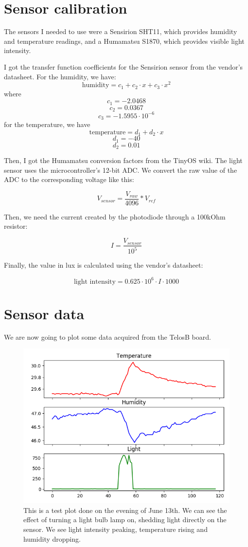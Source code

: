 \documentclass[11pt]{article}
\begin{document}
\section{Sensor calibration}
The sensors I needed to use were a Sensirion SHT11, which provides humidity and temperature readings, and a Humamatsu S1870, which provides visible light intensity. 

I got the transfer function coefficients for the Sensirion sensor from the vendor's datasheet. For the humidity, we have:
$$\text{humidity}=c_1+c_2\cdot x +c_3\cdot x^2$$
where
$$c_1= -2.0468$$
$$c_2=  0.0367$$
$$c_3= -1.5955\cdot10^{-6}$$
for the temperature, we have
$$\text{temperature}=d_1+d_2\cdot x$$ 
$$d_1= -40$$
$$d_2=  0.01$$

Then, I got the Humamatsu conversion factors from the TinyOS wiki. The light sensor uses the microcontroller's 12-bit ADC. We convert the raw value of the ADC to the corresponding voltage like this:

$$ V_{sensor}=\frac{V_{raw}}{4096} * V_{ref} $$ 

Then, we need the current created by the photodiode through a 100kOhm resistor:

$$I = \frac{ V_{sensor} }{10^5}$$

Finally, the value in lux is calculated using the vendor's datasheet: 

$$\text{light intensity} = 0.625\cdot10^6 \cdot I \cdot 1000$$
  

\section{Sensor data}

We are now going to plot some data acquired from the TelosB board.

\begin{figure}[h]
\includegraphics[width=\textwidth]{lamp}
\caption{This is a test plot done on the evening of June 13th. We can see the effect of turning a light bulb lamp on, shedding light directly on the sensor. We see light intensity peaking, temperature rising and humidity dropping.}
\end{figure}
\end{document}
